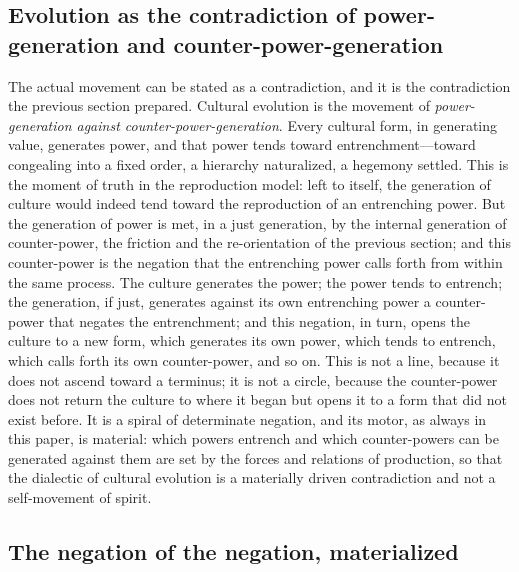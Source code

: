 \subsection*{Evolution as the contradiction of power-generation and counter-power-generation}

The actual movement can be stated as a contradiction, and it is the contradiction the previous section prepared. Cultural evolution is the movement of \emph{power-generation against counter-power-generation}. Every cultural form, in generating value, generates power, and that power tends toward entrenchment---toward congealing into a fixed order, a hierarchy naturalized, a hegemony settled. This is the moment of truth in the reproduction model: left to itself, the generation of culture would indeed tend toward the reproduction of an entrenching power. But the generation of power is met, in a just generation, by the internal generation of counter-power, the friction and the re-orientation of the previous section; and this counter-power is the negation that the entrenching power calls forth from within the same process. The culture generates the power; the power tends to entrench; the generation, if just, generates against its own entrenching power a counter-power that negates the entrenchment; and this negation, in turn, opens the culture to a new form, which generates its own power, which tends to entrench, which calls forth its own counter-power, and so on. This is not a line, because it does not ascend toward a terminus; it is not a circle, because the counter-power does not return the culture to where it began but opens it to a form that did not exist before. It is a spiral of determinate negation, and its motor, as always in this paper, is material: which powers entrench and which counter-powers can be generated against them are set by the forces and relations of production, so that the dialectic of cultural evolution is a materially driven contradiction and not a self-movement of spirit.

\subsection*{The negation of the negation, materialized}

